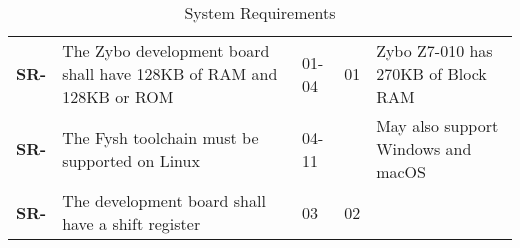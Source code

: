 \resetfyshcounter
\newcommand{\sr}[4]{
	\textbf{SR-\rc} & #1 & #2 & #3 & #4 \\
	\hline
}
\begin{table}[H]
	\begin{tabularx}{\textwidth}{| a | x | a | a | a |}
		\hline

		 &  %
		           &                           %
		           &                           %
		           &                           \\
		\hline
		\sr{The Zybo development board shall have 128KB of RAM and 128KB or ROM}%
		{01-04}%
		{01}%
		{Zybo Z7-010 has 270KB of Block RAM} %

		\sr{The Fysh toolchain must be supported on Linux}%
		{04-11}%
		{}%
		{May also support Windows and macOS}

		\sr{The development board shall have a shift register}%
		{03}%
		{02}%
		{}
	\end{tabularx}
	\caption{System Requirements}
\end{table}

